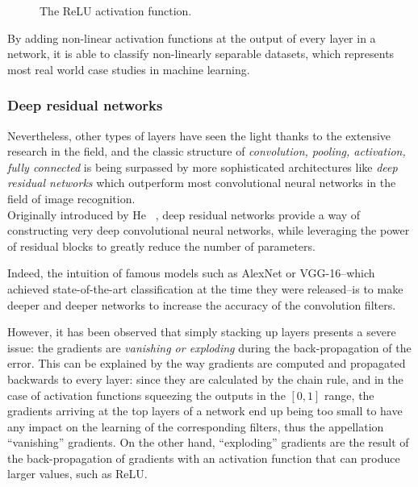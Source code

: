 \begin{figure}[h]
	\centering
	\caption{The ReLU activation function.}
\end{figure}

By adding non-linear activation functions at the output of every layer in a
network, it is able to classify non-linearly separable datasets, which
represents most real world case studies in machine learning.\\


\subsubsection{Deep residual networks}

Nevertheless, other types of layers have seen the light thanks to the extensive
research in the field, and the classic structure of \emph{convolution, pooling,
activation, fully connected} is being surpassed by more sophisticated
architectures like \emph{deep residual networks} which outperform most
convolutional neural networks in the field of image recognition.\\

Originally introduced by He \etal~\cite{He_2016_CVPR}, deep residual networks
provide a way of constructing very deep convolutional neural networks, while
leveraging the power of residual blocks to greatly reduce the number of
parameters.

Indeed, the intuition of famous models such as AlexNet or VGG-16--which
achieved state-of-the-art classification at the time they were released--is to
make deeper and deeper networks to increase the accuracy of the convolution
filters.

However, it has been observed that simply stacking up layers presents a severe
issue: the gradients are \emph{vanishing or exploding} during the
back-propagation of the error. This can be explained by the way gradients are
computed and propagated backwards to every layer: since they are calculated by
the chain rule, and in the case of activation functions squeezing the outputs
in the $[0,1]$ range, the gradients arriving at the top layers of a network end
up being too small to have any impact on the learning of the corresponding
filters, thus the appellation ``vanishing'' gradients. On the other hand,
``exploding'' gradients are the result of the back-propagation of gradients
with an activation function that can produce larger values, such as ReLU.\\

